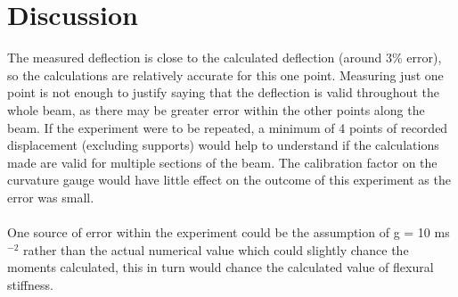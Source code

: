 \documentclass[12pt]{article}
\begin{document}
    \section{Discussion}
        The measured deflection is close to the calculated deflection (around 3\% error), so the calculations are relatively accurate for this one point. 
        Measuring just one point is not enough to justify saying that the deflection is valid throughout the whole beam, as there may be greater error within
        the other points along the beam. If the experiment were to be repeated, a minimum of 4 points of recorded displacement (excluding supports) would help to
        understand if the calculations made are valid for multiple sections of the beam. The calibration factor on the curvature gauge would have little effect 
        on the outcome of this experiment as the error was small. \\ \\
        One source of error within the experiment could be the assumption of g = 10 ms$^{-2}$ rather than the actual numerical value which could slightly chance the moments
        calculated, this in turn would chance the calculated value of flexural stiffness.
\end{document}
